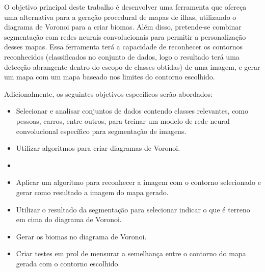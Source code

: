 O objetivo principal deste trabalho é desenvolver uma ferramenta que ofereça uma alternativa para a geração procedural de mapas de ilhas, utilizando o diagrama de Voronoi para a criar biomas. Além disso, pretende-se combinar segmentação com redes neurais convolucionais para permitir a personalização desses mapas. Essa ferramenta terá a capacidade de reconhecer os contornos reconhecidos (classificados no conjunto de dados, logo o resultado terá uma detecção abrangente dentro do escopo de classes obtidas) de uma imagem, e gerar um mapa com um mapa baseado nos limites do contorno escolhido.

Adicionalmente, os seguintes objetivos específicos serão abordados:

\begin{itemize}
	\item Selecionar e analisar conjuntos de dados contendo classes relevantes, como pessoas, carros, entre outros, para treinar um modelo de rede neural convolucional específico para segmentação de imagens.
	\item Utilizar algoritmos para criar diagramas de Voronoi.
	\item \item Aplicar um algoritmo para reconhecer a imagem com o contorno selecionado e gerar como resultado a imagem do mapa gerado.
	\item Utilizar o resultado da segmentação para selecionar indicar o que é terreno em cima do diagrama de Voronoi.
	\item Gerar os biomas no diagrama de Voronoi.
	\item Criar testes em prol de mensurar a semelhança entre o contorno do mapa gerada com o contorno escolhido.
\end{itemize}

